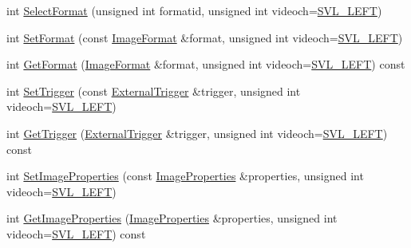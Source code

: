 \begin{DoxyCompactItemize}
\item 
int \hyperlink{classsvl_filter_source_video_capture_ae2c6ad1d0236879bd925449a372f2346}{Select\+Format} (unsigned int formatid, unsigned int videoch=\hyperlink{svl_definitions_8h_ab9fec7615f19c8df2919eebcab0b187f}{S\+V\+L\+\_\+\+L\+E\+F\+T})
\item 
int \hyperlink{classsvl_filter_source_video_capture_ae52650c5e7e0c082c11f9f1cd1a80bcc}{Set\+Format} (const \hyperlink{classsvl_filter_source_video_capture_a0944cc8abe4240701683128c28fa5349}{Image\+Format} \&format, unsigned int videoch=\hyperlink{svl_definitions_8h_ab9fec7615f19c8df2919eebcab0b187f}{S\+V\+L\+\_\+\+L\+E\+F\+T})
\item 
int \hyperlink{classsvl_filter_source_video_capture_a249fb6ec35e4888c8426fbc97cf2625c}{Get\+Format} (\hyperlink{classsvl_filter_source_video_capture_a0944cc8abe4240701683128c28fa5349}{Image\+Format} \&format, unsigned int videoch=\hyperlink{svl_definitions_8h_ab9fec7615f19c8df2919eebcab0b187f}{S\+V\+L\+\_\+\+L\+E\+F\+T}) const 
\item 
int \hyperlink{classsvl_filter_source_video_capture_a0a756acc24c4c262b23d40671f8a3d7c}{Set\+Trigger} (const \hyperlink{classsvl_filter_source_video_capture_a609a8eb75ea23b7b35068207cc3c3144}{External\+Trigger} \&trigger, unsigned int videoch=\hyperlink{svl_definitions_8h_ab9fec7615f19c8df2919eebcab0b187f}{S\+V\+L\+\_\+\+L\+E\+F\+T})
\item 
int \hyperlink{classsvl_filter_source_video_capture_a13ad2c1cec2121ea7742f4c00bb49059}{Get\+Trigger} (\hyperlink{classsvl_filter_source_video_capture_a609a8eb75ea23b7b35068207cc3c3144}{External\+Trigger} \&trigger, unsigned int videoch=\hyperlink{svl_definitions_8h_ab9fec7615f19c8df2919eebcab0b187f}{S\+V\+L\+\_\+\+L\+E\+F\+T}) const 
\item 
int \hyperlink{classsvl_filter_source_video_capture_a35dbd104d0ea8c40300e571ee17c2fac}{Set\+Image\+Properties} (const \hyperlink{classsvl_filter_source_video_capture_ad5d8ccc6a284be386d49b60574937f4d}{Image\+Properties} \&properties, unsigned int videoch=\hyperlink{svl_definitions_8h_ab9fec7615f19c8df2919eebcab0b187f}{S\+V\+L\+\_\+\+L\+E\+F\+T})
\item 
int \hyperlink{classsvl_filter_source_video_capture_a3e217734151f975b80fdc1c2e8173e33}{Get\+Image\+Properties} (\hyperlink{classsvl_filter_source_video_capture_ad5d8ccc6a284be386d49b60574937f4d}{Image\+Properties} \&properties, unsigned int videoch=\hyperlink{svl_definitions_8h_ab9fec7615f19c8df2919eebcab0b187f}{S\+V\+L\+\_\+\+L\+E\+F\+T}) const 
\item 

\end{DoxyCompactItemize}
